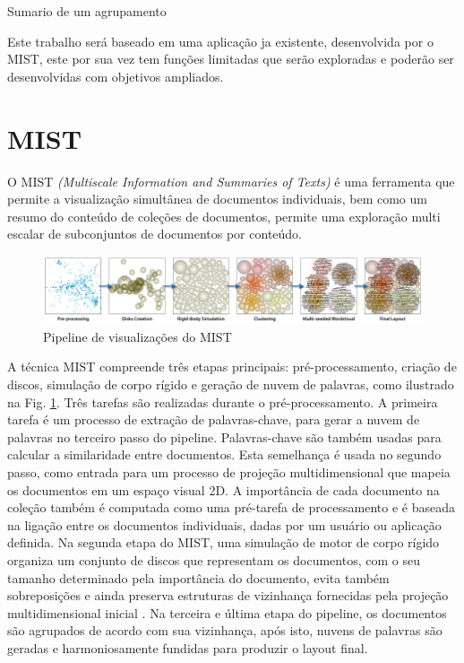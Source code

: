 Sumario de um agrupamento



Este trabalho será baseado em uma aplicação ja existente, desenvolvida por \cite{pagliosa2013mist} o MIST, este por sua vez tem funções limitadas que serão exploradas e poderão ser desenvolvidas com objetivos ampliados.

\section{MIST}
\label{mist}

O MIST \textit{(Multiscale Information and Summaries of Texts)} é uma ferramenta que permite a visualização simultânea de documentos individuais, bem como um resumo do conteúdo de coleções de documentos, permite uma exploração multi escalar de subconjuntos de documentos por conteúdo\cite{pagliosa2013mist}. 


\begin{figure}[!ht]
	\centering
	\includegraphics[width=1\columnwidth]{images/mist_pipeline.png}
	\caption{Pipeline de visualizações do MIST \cite{pagliosa2013mist}}
	\label{fig:MISTpipeline}
\end{figure}

A técnica MIST compreende três etapas principais: pré-processamento, criação de discos, simulação de corpo rígido e geração de nuvem de palavras, como ilustrado na Fig. \ref{fig:MISTpipeline}. Três tarefas são realizadas durante o pré-processamento. A primeira tarefa é um processo de extração de palavras-chave, para gerar a nuvem de palavras no terceiro passo do pipeline. Palavras-chave são também usadas para calcular a similaridade entre documentos. Esta semelhança é usada no segundo passo, como entrada para um processo de projeção multidimensional que mapeia os documentos em um espaço visual 2D. A importância de cada documento na coleção também é computada como uma pré-tarefa de processamento e é baseada na ligação entre os documentos individuais, dadas por um usuário ou aplicação definida. Na segunda etapa do MIST, uma simulação de motor de corpo rígido  organiza um conjunto de discos que representam os documentos, com o seu tamanho determinado pela importância do documento, evita também sobreposições e ainda preserva estruturas de vizinhança fornecidas pela projeção multidimensional inicial \cite{pagliosa2013mist}.
Na terceira e última etapa do pipeline, os documentos são agrupados de acordo com sua vizinhança, após isto, nuvens de palavras são geradas e harmoniosamente fundidas para produzir o layout final.

